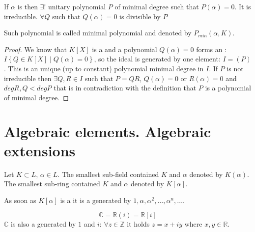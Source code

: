 \begin{lemma}
  If $\alpha$ is  then
  $\exists!$ unitary polynomial $P$ of minimal degree such that
  $P\left(\alpha\right) = 0$. It is irreducible. $\forall Q$ such that
  $Q\left(\alpha\right) = 0$ is divisible by $P$
  \begin{definition}
    Such polynomial is called minimal polynomial and denoted by
    $P_{min}\left(\alpha, K\right)$.
    \label{def:minpolynomial}
  \end{definition}
  \begin{proof}
    We know that $K\left[X\right]$ is a  and a
    polynomial $Q\left(\alpha\right) = 0$ forms an
    : $I \left\{Q \in K\left[X\right] \mid
    Q\left(\alpha\right) = 0 \right\}$, so the ideal is generated by
    one element: $I = \left(P\right)$. This is an unique (up to
    constant) polynomial minimal degree in $I$.
    If $P$ is not irreducible then $\exists Q,R \in I$ such that $P = Q
    R$, $Q(\alpha) = 0$ or $R(\alpha) = 0$ and
    $deg R,Q < deg P$ that is in contradiction with the definition
    that $P$ is a polynomial of minimal degree.
  \end{proof}
  \label{lem:minpolynomial}
\end{lemma}

\section{Algebraic elements. Algebraic extensions}

\begin{definition}
  Let $K \subset L$, $\alpha \in L$. The smallest sub-field contained
  $K$ and $\alpha$ denoted by $K\left(\alpha\right)$. The smallest
  sub-ring contained $K$ and $\alpha$ denoted by $K\left[\alpha\right]$.
\end{definition}

As soon as $K\left[\alpha\right]$ is a  it is a
 generated by $1, \alpha, \alpha^2, \dots,
\alpha^n, \dots$.

\begin{example}[$\mathbb{C}$]
  \[
  \mathbb{C} = \mathbb{R}\left(i\right) = \mathbb{R}\left[i\right]
  \]
  $\mathbb{C}$ is also a  generated by $1$
  and $i$: $\forall z \in \mathbb{Z}$ it holds $z = x + i y$ where
  $x,y \in \mathbb{R}$.
\end{example}

